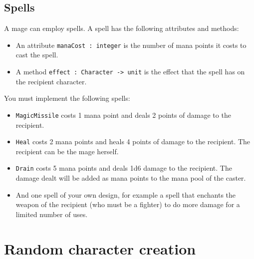 \documentclass[a4paper]{article}
\begin{document}
\subsection{Spells}\label{spells}

A mage can employ spells.  A spell has the following attributes and
methods:

\begin{itemize}
\item An attribute \texttt{manaCost : integer} is the number of mana
  points it costs to cast the spell.
\item A method \texttt{effect : Character -> unit} is the effect that
  the spell has on the recipient character.
\end{itemize}

\noindent
You must implement the following spells:

\begin{itemize}
\item \texttt{MagicMissile} costs 1 mana point and deals 2 points of
  damage to the recipient.

\item \texttt{Heal} costs 2 mana points and heals 4 points of damage
  to the recipient.  The recipient can be the mage herself.

\item \texttt{Drain} costs 5 mana points and deals 1d6 damage to the
  recipient.  The damage dealt will be added as mana points to the
  mana pool of the caster.

\item And one spell of your own design, for example a spell that
  enchants the weapon of the recipient (who must be a fighter) to do
  more damage for a limited number of uses.
\end{itemize}

\section{Random character creation}
\end{document}
